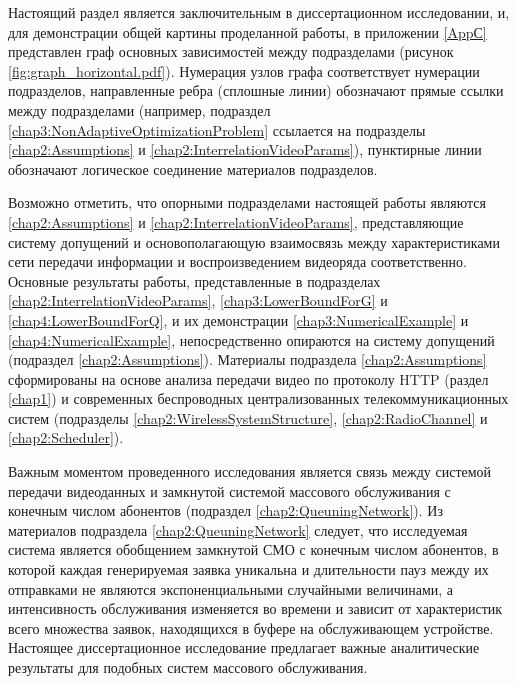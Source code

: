 Настоящий раздел является заключительным в диссертационном исследовании, и, для демонстрации общей картины проделанной работы, в приложении \ref{AppС} представлен граф основных зависимостей между подразделами (рисунок \ref{fig:graph_horizontal.pdf}). Нумерация узлов графа соответствует нумерации подразделов, направленные ребра (сплошные линии) обозначают прямые ссылки между подразделами (например, подраздел \ref{chap3:NonAdaptiveOptimizationProblem} ссылается на подразделы \ref{chap2:Assumptions} и \ref{chap2:InterrelationVideoParams}), пунктирные линии обозначают логическое соединение материалов подразделов.

Возможно отметить, что опорными подразделами настоящей работы являются \ref{chap2:Assumptions} и \ref{chap2:InterrelationVideoParams}, представляющие систему допущений и основополагающую взаимосвязь между характеристиками сети передачи информации и воспроизведением видеоряда соответственно. Основные результаты работы, представленные в подразделах \ref{chap2:InterrelationVideoParams}, \ref{chap3:LowerBoundForG} и \ref{chap4:LowerBoundForQ}, и их демонстрации \ref{chap3:NumericalExample} и \ref{chap4:NumericalExample}, непосредственно опираются на систему допущений (подраздел \ref{chap2:Assumptions}). Материалы подраздела \ref{chap2:Assumptions} сформированы на основе анализа передачи видео по протоколу HTTP (раздел \ref{chap1}) и современных беспроводных централизованных телекоммуникационных систем (подразделы \ref{chap2:WirelessSystemStructure}, \ref{chap2:RadioChannel} и \ref{chap2:Scheduler}).

Важным моментом проведенного исследования является связь между системой передачи видеоданных и замкнутой системой массового обслуживания с конечным числом абонентов (подраздел \ref{chap2:QueuningNetwork}). Из материалов подраздела \ref{chap2:QueuningNetwork} следует, что исследуемая система является обобщением замкнутой СМО с конечным числом абонентов, в которой каждая генерируемая заявка уникальна и длительности пауз между их отправками не являются экспоненциальными случайными величинами, а интенсивность обслуживания изменяется во времени и зависит от характеристик всего множества заявок, находящихся в буфере на обслуживающем устройстве. Настоящее диссертационное исследование предлагает важные аналитические результаты для подобных систем массового обслуживания.
